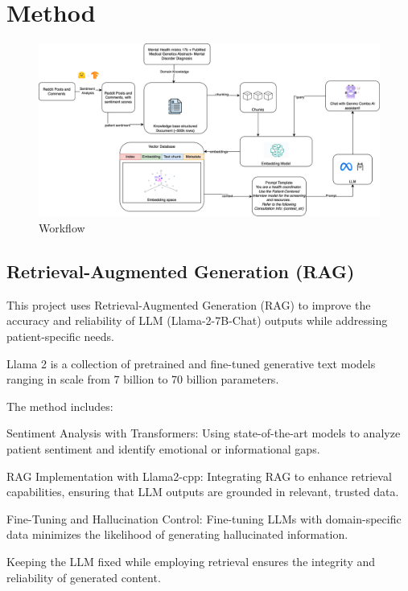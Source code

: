 \documentclass{article} %
\begin{document}
\section{Method}

\begin{figure}[h]
\begin{center}
\includegraphics[width=\textwidth]{fig/workflow.png}
\end{center}
\caption{Workflow}
\end{figure}

\subsection{Retrieval-Augmented Generation (RAG)}

This project uses Retrieval-Augmented Generation (RAG) to improve the accuracy and reliability of LLM (Llama-2-7B-Chat\citet{touvron2023llama2openfoundation}) outputs while addressing patient-specific needs. 

Llama 2 is a collection of pretrained and fine-tuned generative text models ranging in scale from 7 billion to 70 billion parameters.

The method includes:

Sentiment Analysis with Transformers: Using state-of-the-art models to analyze patient sentiment and identify emotional or informational gaps.

RAG Implementation with Llama2-cpp: Integrating RAG to enhance retrieval capabilities, ensuring that LLM outputs are grounded in relevant, trusted data.

Fine-Tuning and Hallucination Control:
Fine-tuning LLMs with domain-specific data minimizes the likelihood of generating hallucinated information.

Keeping the LLM fixed while employing retrieval ensures the integrity and reliability of generated content.
\end{document}
